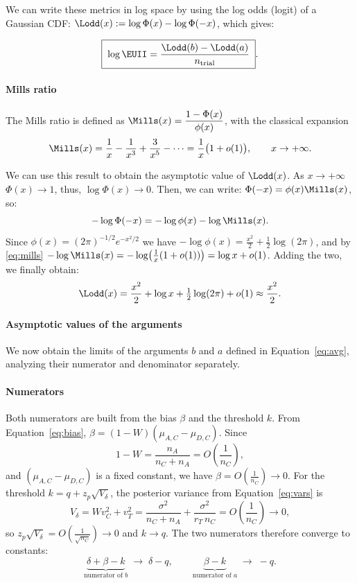 We can write these metrics in log space by using the log odds (logit) of a Gaussian CDF:
$\Lodd(x):=\log\Phi(x)-\log\Phi(-x)$, which gives: 

\begin{equation}\label{eq:logeuii}
  \boxed{\;\log\EUII=\frac{\Lodd(b)-\Lodd(a)}{n_{\text{trial}}}\;}.
\end{equation}


\paragraph{Mills ratio}
The Mills ratio is defined as $\Mills(x)=\dfrac{1-\Phi(x)}{\phi(x)}$, with the classical
expansion
\begin{equation}\label{eq:mills}
  \Mills(x)=\frac1x-\frac1{x^3}+\frac{3}{x^5}-\cdots=\frac1x\bigl(1+o(1)\bigr),
  \qquad x\to+\infty .
\end{equation}

We can use this result to obtain the asymptotic value of $\Lodd(x)$.
As $x\to+\infty$ $\Phi(x) \to 1$, thus, $\log \Phi(x) \to 0$. Then, we can write:
$\Phi(-x) = \phi(x) \Mills(x)$, so:
\[
  -\log\Phi(-x) =-\log\phi(x)-\log \Mills(x).
\]
Since $\phi(x)=(2\pi)^{-1/2}e^{-x^2/2}$ we have $-\log\phi(x)=\tfrac{x^2}{2}+\tfrac12\log(2\pi)$,
and by \eqref{eq:mills} $-\log\Mills(x)=-\log\!\big(\tfrac1x(1+o(1))\big)=\log x+o(1)$.
Adding the two, we finally obtain:
\[
  \Lodd(x)=\frac{x^2}{2}+\log x+\tfrac12\log(2\pi)+o(1) \approx \frac{x^2}{2}.
\]

 
\paragraph{Asymptotic values of the arguments}
We now obtain the limits of the arguments $b$ and $a$ defined in Equation~\eqref{eq:avg}, analyzing their numerator and denominator separately.

\paragraph{Numerators} Both numerators are built from the bias $\beta$ and the threshold $k$.
From Equation~\eqref{eq:bias}, $\beta = (1 - W)(\mu_{A,C} - \mu_{D,C})$. Since
\[
  1 - W = \frac{n_A}{n_C + n_A} = O\!\left(\frac{1}{n_C}\right),
\]
and $(\mu_{A,C} - \mu_{D,C})$ is a fixed constant, we have $\beta = O\!\left(\frac{1}{n_C}\right) \to 0$. For the threshold $k = q + z_p \sqrt{V_\delta}$, the posterior variance from Equation~\eqref{eq:vars} is
\[
  V_\delta = W v_C^2 + v_T^2 = \frac{\sigma^2}{n_C + n_A} + \frac{\sigma^2}{r_T\, n_C} = O\!\left(\frac{1}{n_C}\right) \to 0,
\]
so $z_p \sqrt{V_\delta} = O\!\left(\frac{1}{\sqrt{n_C}}\right) \to 0$ and $k \to q$. The two numerators therefore converge to constants:
\[
  \underbrace{\delta + \beta - k}_{\text{numerator of } b} \;\longrightarrow\; \delta - q,
  \qquad
  \underbrace{\beta - k}_{\text{numerator of } a} \;\longrightarrow\; -q.
\]

